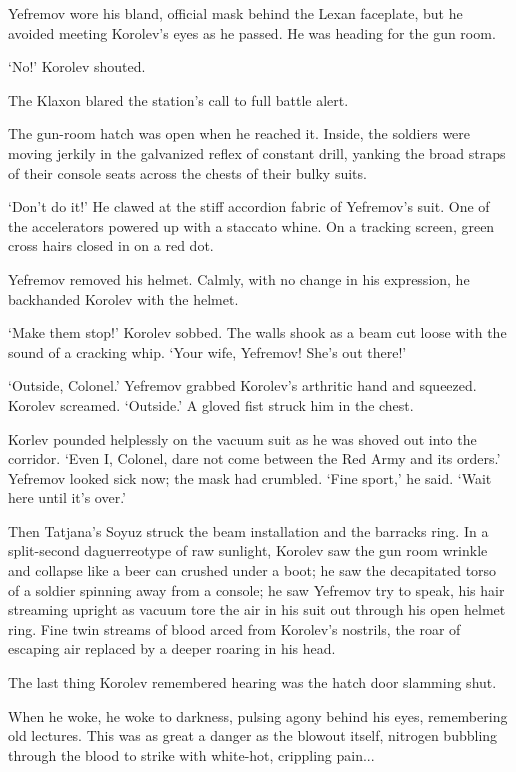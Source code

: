 Yefremov wore his bland, official mask behind the Lexan faceplate, but he avoided meeting Korolev's eyes as he passed. He was heading for the gun room.

`No!' Korolev shouted.

The Klaxon blared the station's call to full battle alert.

The gun-room hatch was open when he reached it. Inside, the soldiers were moving jerkily in the galvanized reflex of constant drill, yanking the broad straps of their console seats across the chests of their bulky suits.

`Don't do it!' He clawed at the stiff accordion fabric of Yefremov's suit. One of the accelerators powered up with a staccato whine. On a tracking screen, green cross hairs closed in on a red dot.

Yefremov removed his helmet. Calmly, with no change in his expression, he backhanded Korolev with the helmet.

`Make them stop!' Korolev sobbed. The walls shook as a beam cut loose with the sound of a cracking whip. `Your wife, Yefremov! She's out there!'

`Outside, Colonel.' Yefremov grabbed Korolev's arthritic hand and squeezed. Korolev screamed. `Outside.' A gloved fist struck him in the chest.

Korlev pounded helplessly on the vacuum suit as he was shoved out into the corridor. `Even I, Colonel, dare not come between the Red Army and its orders.' Yefremov looked sick now; the mask had crumbled. `Fine sport,' he said. `Wait here until it's over.'

Then Tatjana's Soyuz struck the beam installation and the barracks ring. In a split-second daguerreotype of raw sunlight, Korolev saw the gun room wrinkle and collapse like a beer can crushed under a boot; he saw the decapitated torso of a soldier spinning away from a console; he saw Yefremov try to speak, his hair streaming upright as vacuum tore the air in his suit out through his open helmet ring. Fine twin streams of blood arced from Korolev's nostrils, the roar of escaping air replaced by a deeper roaring in his head.

The last thing Korolev remembered hearing was the hatch door slamming shut.

When he woke, he woke to darkness, pulsing agony behind his eyes, remembering old lectures. This was as great a danger as the blowout itself, nitrogen bubbling through the blood to strike with white-hot, crippling pain...

